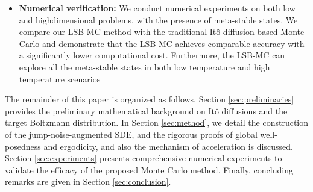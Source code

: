 \begin{itemize}
    \item \textbf{Numerical verification:} We conduct numerical experiments on both low and highdimensional problems, with the presence of meta-stable states. We compare
our LSB-MC method with the traditional It\^{o} diffusion-based Monte Carlo and demonstrate that the LSB-MC achieves comparable
accuracy with a significantly lower computational cost. Furthermore, the LSB-MC can explore
all the meta-stable states in both low temperature and high temperature scenarios
\end{itemize}

The remainder of this paper is organized as follows. Section \ref{sec:preliminaries} provides the preliminary mathematical background on It\^{o} diffusions and the target Boltzmann distribution. In Section \ref{sec:method}, we detail the construction of the jump-noise-augmented SDE, and the rigorous proofs of global well-posedness and ergodicity, and also the mechanism of acceleration is discussed. Section \ref{sec:experiments} presents comprehensive numerical experiments to validate the efficacy of the proposed Monte Carlo method. Finally, concluding remarks are given in Section \ref{sec:conclusion}.


